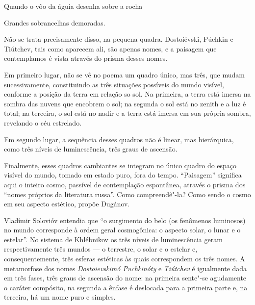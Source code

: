 Quando o vôo da águia desenha sobre a rocha

Grandes sobrancelhas demoradas.

Não se trata precisamente disso, na pequena quadra. Dostoiévski, Púchkin
e Tiútchev, tais como aparecem ali, são apenas nomes, e a paisagem que
contemplamos é vista através do prisma desses nomes.

Em primeiro lugar, não se vê no poema um quadro único, mas três, que
mudam sucessivamente, constituindo as três situações possíveis do mundo
visível, conforme a posição da terra em relação so sol. Na primeira, a
terra está imersa na sombra das nuvens que encobrem o sol; na segunda o
sol está no zenith e a luz é total; na terceira, o sol está no nadir e a
terra está imersa em sua própria sombra, revelando o céu estrelado.

Em segundo lugar, a sequência desses quadros não é linear, mas
hierárquica, como três níveis de luminescência, três graus de ascensão.

Finalmente, esses quadros cambiantes se integram no único quadro do
espaço visível do mundo, tomado em estado puro, fora do tempo.
``Paisagem'' significa aqui o inteiro cosmo, passível de contemplação
espontânea, através o prisma dos ``nomes próprios da literatura russa''.
Como compreendê"-la? Como sendo o cosmo em seu aspecto estético, propõe
Dugánov.

Vladímir Solovióv entendia que ``o surgimento do belo (os fenômenos
luminosos) no mundo corresponde à ordem geral cosmogônica: o aspecto
solar, o lunar e o estelar''. No sistema de Khlébnikov os três níveis de
luminescência geram respectivamente três mundos --- o terrestre, o solar
e o estelar e, consequentemente, três esferas estéticas às quais
correspondem os três nomes. A metamorfose dos nomes \emph{Dostoievskimó
Puchkinóty} e \emph{Tiútchev} é igualmente dada em três fases, três
graus de ascensão do nome: na primeira sente"-se agudamente o caráter
compósito, na segunda a ênfase é deslocada para a primeira parte e, na
terceira, há um nome puro e simples.

